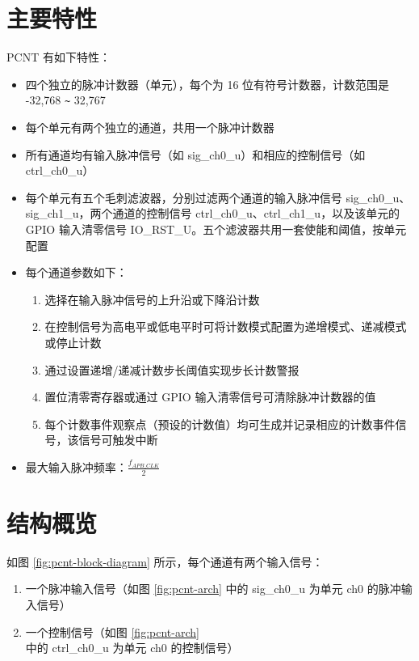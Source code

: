 \documentclass[main\_\_CN.tex]{subfiles}
\begin{document}
\section{主要特性}\label{sec:pcnt-features}
PCNT 有如下特性：
\begin{itemize}
    \item 四个独立的脉冲计数器（单元），每个为 16 位有符号计数器，计数范围是 -32,768 \verb+~+ 32,767
    \item 每个单元有两个独立的通道，共用一个脉冲计数器
    \item 所有通道均有输入脉冲信号（如 sig\_ch0\_u）和相应的控制信号（如 ctrl\_ch0\_u）
    \item 每个单元有五个毛刺滤波器，分别过滤两个通道的输入脉冲信号 sig\_ch0\_u、sig\_ch1\_u，两个通道的控制信号 ctrl\_ch0\_u、ctrl\_ch1\_u，以及该单元的 GPIO 输入清零信号 IO\_RST\_U。五个滤波器共用一套使能和阈值，按单元配置
    \item 每个通道参数如下：
        \begin{enumerate}
            \item 选择在输入脉冲信号的上升沿或下降沿计数
            \item 在控制信号为高电平或低电平时可将计数模式配置为递增模式、递减模式或停止计数
            \item 通过设置递增/递减计数步长阈值实现步长计数警报
            \item 置位清零寄存器或通过 GPIO 输入清零信号可清除脉冲计数器的值
            \item 每个计数事件观察点（预设的计数值）均可生成并记录相应的计数事件信号，该信号可触发中断
        \end{enumerate}
    \item 最大输入脉冲频率：$\frac{f_{APB\_CLK}}{2}$
\end{itemize}


\section{结构概览}
\label{sec:pcnt-arch-overview}

如图 \ref{fig:pcnt-block-diagram} \textit{} 所示，每个通道有两个输入信号：
\begin{enumerate}
    \item 一个脉冲输入信号（如图 \ref{fig:pcnt-arch} \textit{} 中的 sig\_ch0\_u 为单元  ch0 的脉冲输入信号）
    \item 一个控制信号（如图 \ref{fig:pcnt-arch} \textit{} 中的 ctrl\_ch0\_u 为单元  ch0 的控制信号）
\end{enumerate}
\end{document}
